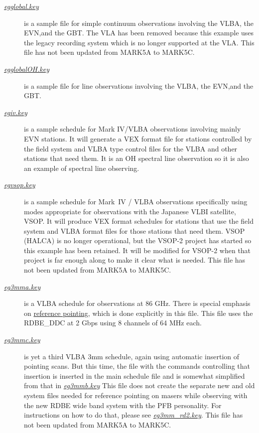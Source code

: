 \documentclass{report}
\begin{document}
\begin{description}
\item[
{\href{examples/egglobal.key}{{\sl egglobal.key}}}]
is a sample file for simple continuum observations involving the VLBA,
the EVN,and the GBT.  The VLA has been removed because this example
uses the legacy recording system which is no longer supported at the
VLA. This file has not been updated from MARK5A to MARK5C.

\item[
{\href{examples/egglobalOH.key}{{\sl egglobalOH.key}}}]
is a sample file for line observations involving the VLBA,
the EVN,and the GBT.

\item[
{\href{examples/egiv.key}{{\sl egiv.key}}}] is a
sample schedule for Mark IV/VLBA observations involving mainly EVN
stations.  It will generate a VEX format file for stations controlled
by the field system and VLBA type control files for the VLBA and other
stations that need them.  It is an OH spectral line observation so it
is also an example of spectral line observing.

\item[
{\href{examples/egvsop.key}{{\sl egvsop.key}}}] is a
sample schedule for Mark~IV / VLBA observations specifically using
modes appropriate for observations with the Japanese VLBI satellite,
VSOP.  It will produce VEX format schedules for stations that use the
field system and VLBA format files for those stations that need them.
VSOP (HALCA) is no longer operational, but the VSOP-2 project has started
so this example has been retained.  It will be modified for VSOP-2
when that project is far enough along to make it clear what is needed.
This file has not been updated from MARK5A to MARK5C.

\item[
{\href{examples/eg3mma.key}{{\sl eg3mma.key}}}] is a
VLBA schedule for observations at 86 GHz.  There is special emphasis
on 
{\hyperref[SEC:REFPOINT]{reference pointing}}, which is done
explicitly in this file.   This file uses the RDBE\_DDC at 2 Gbps
using 8 channels of 64 MHz each.

\item[
{\href{examples/eg3mmc.key}{{\sl eg3mmc.key}}}] is
yet a third VLBA 3mm schedule, again using automatic insertion of
pointing scans.  But this time, the file with the commands controlling
that insertion is inserted in the main schedule file and is somewhat
simplified from that in 
{\href{examples/eg3mmb.key}{{\sl eg3mmb.key}}}
This file does not create the separate new and old system files needed
for reference pointing on masers while observing with the new RDBE wide
band system with the PFB personality.  For instructions on how to do 
that, please see 
{\href{examples/eg3mm\_rd2.key}{{\sl eg3mm\_rd2.key}}}.
This file has not been updated from MARK5A to MARK5C.


\end{description}
\end{document}
